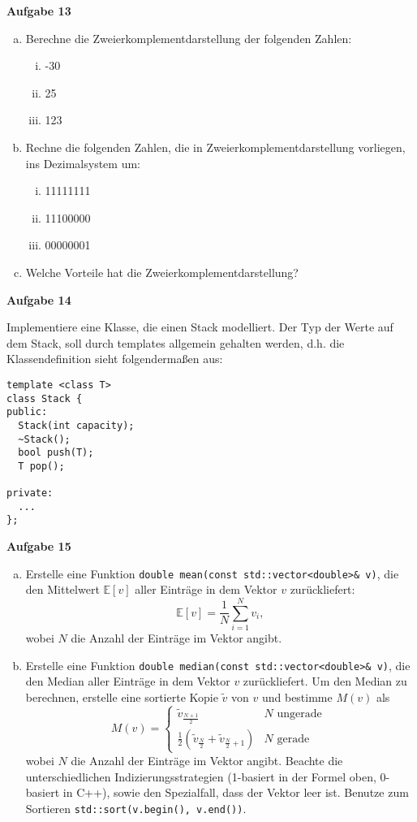 \documentclass[a4paper,12pt]{article}
\newcommand{\Aufgabe}[1]{
  {
    \vspace*{0.5cm}
    \textsf{\textbf{Aufgabe #1}}
    \vspace*{0.2cm}
    
  }
}
\begin{document}
\Aufgabe{13}
\begin{enumerate}[a)]
\item 
  Berechne die Zweierkomplementdarstellung der folgenden Zahlen:
  \begin{enumerate}[i)]
  \item -30
  \item 25
  \item 123
  \end{enumerate}

\item
  Rechne die folgenden Zahlen, die in Zweierkomplementdarstellung vorliegen, ins Dezimalsystem um:
  \begin{enumerate}[i)]
  \item 11111111
  \item 11100000
  \item 00000001
  \end{enumerate}

\item Welche Vorteile hat die Zweierkomplementdarstellung?
\end{enumerate}

\Aufgabe{14}
Implementiere eine Klasse, die einen Stack modelliert. Der Typ der Werte auf dem Stack, soll durch templates allgemein gehalten werden, d.h. die Klassendefinition sieht folgendermaßen aus:
\begin{lstlisting}
template <class T>
class Stack {
public:
  Stack(int capacity);
  ~Stack();
  bool push(T);
  T pop();

private:
  ...
};
\end{lstlisting}

\Aufgabe{15}
\begin{enumerate}[a)]
\item Erstelle eine Funktion \lstinline{double mean(const std::vector<double>& v)}, die den Mittelwert $\mathbb{E}[v]$ aller Einträge in dem Vektor $v$ zurückliefert:
  $$
  \mathbb{E}[v] = \frac{1}{N} \sum\limits_{i=1}^N{v_i},
  $$
  wobei $N$ die Anzahl der Einträge im Vektor angibt.
\item Erstelle eine Funktion \lstinline{double median(const std::vector<double>& v)}, die den Median aller Einträge in dem Vektor $v$ zurückliefert. Um den Median zu berechnen, erstelle eine sortierte Kopie $\tilde{v}$ von $v$ und bestimme $M(v)$ als
  $$
  M(v) =
  \begin{cases}
    \tilde{v}_{\frac{N+1}{2}} & N \text{ ungerade } \\
    \frac{1}{2} ( \tilde{v}_{\frac{N}{2}} +  \tilde{v}_{\frac{N}{2}+1} ) & N \text{ gerade }
  \end{cases}
  $$
  wobei $N$ die Anzahl der Einträge im Vektor angibt. Beachte die unterschiedlichen Indizierungsstrategien (1-basiert in der Formel oben, 0-basiert in C++), sowie den Spezialfall, dass der Vektor leer ist. Benutze zum Sortieren \lstinline{std::sort(v.begin(), v.end())}.
\end{enumerate}
\end{document}
